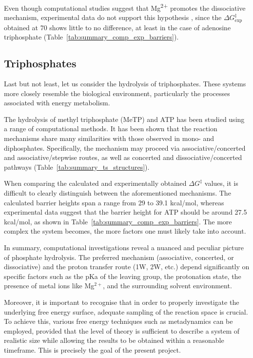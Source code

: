 Even though computational studies suggest that Mg\textsuperscript{2+} promotes the dissociative mechanism, experimental data do not support this hypothesis \citep{ramirezMagnesiumCalciumIon1980}, since the $\Delta G^{\ddagger}_{\text{exp}}$ obtained at 70 shows little to no difference, at least in the case of adenosine triphosphate (Table~\ref{tab:summary_comp_exp_barriers}).



\subsection{Triphosphates}
Last but not least, let us consider the hydrolysis of triphosphates. These systems more closely resemble the biological environment, particularly the processes associated with energy metabolism.

The hydrolysis of methyl triphosphate (MeTP) and ATP has been studied using a range of computational methods. It has been shown that the reaction mechanisms share many similarities with those observed in mono- and diphosphates. Specifically, the mechanism may proceed via associative/concerted and associative/stepwise routes, as well as concerted and dissociative/concerted pathways (Table~\ref{tab:summary_ts_structures}). 

When comparing the calculated and experimentally obtained $\Delta G^{\ddagger}$ values, it is difficult to clearly distinguish between the aforementioned mechanisms. The calculated barrier heights span a range from 29 to 39.1 kcal/mol, whereas experimental data suggest that the barrier height for ATP should be around 27.5 kcal/mol, as shown in Table~\ref{tab:summary_comp_exp_barriers}. The more complex the system becomes, the more factors one must likely take into account.

In summary, computational investigations reveal a nuanced and peculiar picture of phosphate hydrolysis. The preferred mechanism (associative, concerted, or dissociative) and the proton transfer route (1W, 2W, etc.) depend significantly on specific factors such as the pKa of the leaving group, the protonation state, the presence of metal ions like Mg$^{2+}$, and the surrounding solvent environment. 

Moreover, it is important to recognise that in order to properly investigate the underlying free energy surface, adequate sampling of the reaction space is crucial. To achieve this, various free energy techniques such as metadynamics can be employed, provided that the level of theory is sufficient to describe a system of realistic size while allowing the results to be obtained within a reasonable timeframe. This is precisely the goal of the present project.



